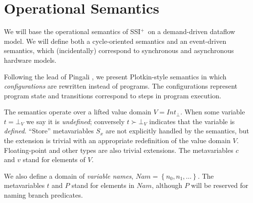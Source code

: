 \documentclass[12pt,notitlepage,twoside]{article}
\newcommand{\set}[1]{\ensuremath{\left\{#1\right\}}}
\newcommand{\ssiplus}{SSI$^+$}
\begin{document}
\section{Operational Semantics}
We will base the operational semantics of \ssiplus\ on a demand-driven
dataflow model.  We will define both a cycle-oriented semantics and an
event-driven semantics, which (incidentally) correspond to synchronous
and asynchronous hardware models.

Following the lead of Pingali \cite{pingali90:dfg}, we present Plotkin-style
semantics \cite{plotkin81:opsem} in which \emph{configurations} are
rewritten instead of programs.  The configurations represent program
state and transitions correspond to steps in program execution.

The semantics operate over a lifted value domain
$V=\mathit{Int}_\bot$. When some variable $t = \bot_V$ we say it is
\emph{undefined}; conversely $t\succ\bot_V$ indicates that the
variable is \emph{defined}.  ``Store'' metavariables $S_x$ are not
explicitly handled by the semantics, but the extension is trivial with
an appropriate redefinition of the value domain $V$.  Floating-point
and other types are also trivial extensions.  The
metavariables $c$ and $v$ stand for elements of $V$.

We also define a domain of \emph{variable names},
$\mathit{Nam}=\set{n_0,n_1,\ldots}$.  The metavariables $t$ and $P$ stand for
elements in $\mathit{Nam}$, although $P$ will be reserved for naming branch predicates.
\end{document}
